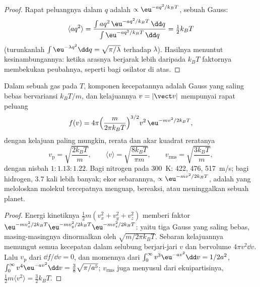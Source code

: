 \begin{proof}
Rapat peluangnya dalam $q$ adalah $\propto\eu^{-aq^2/k_BT}$, sebuah Gauss:
\[
\langle aq^2\rangle = \frac{\int aq^2\,\eu^{-aq^2/k_BT}\,\dd q}{\int\eu^{-aq^2/k_BT}\,\dd q} = \tfrac12k_BT
\]
(turunkanlah $\int\eu^{-\lambda q^2}\dd q = \sqrt{\pi/\lambda}$ terhadap
$\lambda$). Hasilnya menuntut kesinambungannya: ketika
arasnya berjarak lebih daripada $k_BT$ faktornya membekukan peubahnya,
seperti bagi osilator di atas.
\end{proof}

\begin{theorem}\label{thm:b2:boltzmann-factor:maxwell}
Dalam sebuah gas pada $T$, komponen kecepatannya adalah Gauss yang saling bebas bervariansi
$k_BT/m$, dan kelajuannya $v = |\vect v|$ mempunyai rapat
peluang
\[
f(v) = 4\pi\Big(\frac{m}{2\pi k_BT}\Big)^{3/2}v^2\,\eu^{-mv^2/2k_BT} ,
\]
dengan kelajuan paling mungkin, rerata dan akar kuadrat reratanya
\[
v_{\text{p}} = \sqrt{\frac{2k_BT}{m}}, \qquad
\langle v\rangle = \sqrt{\frac{8k_BT}{\pi m}}, \qquad
v_{\text{rms}} = \sqrt{\frac{3k_BT}{m}} ,
\]
dengan nisbah $1 : 1.13 : 1.22$. Bagi nitrogen pada \qty{300}{K}: \qty{422}{},
\qty{476}{}, \qty{517}{m/s}; bagi hidrogen, $3.7$ kali lebih banyak;
ekor sebarannya, $\propto\eu^{-mv^2/2k_BT}$, adalah yang meloloskan
molekul tercepatnya menguap, bereaksi, atau meninggalkan sebuah planet.
\end{theorem}

\begin{proof}
Energi kinetiknya $\tfrac12m(v_x^2 + v_y^2 + v_z^2)$ memberi faktor
$\eu^{-mv_x^2/2k_BT}\eu^{-mv_y^2/2k_BT}\eu^{-mv_z^2/2k_BT}$: yaitu tiga Gauss yang saling
bebas, masing-masingnya dinormalkan oleh $\sqrt{m/2\pi k_BT}$. Sebaran
kelajuannya memungut semua kecepatan dalam selubung berjari-jari $v$ dan
bervolume $4\pi v^2\dd v$. Lalu $v_{\text{p}}$ dari $\dd f/\dd v = 0$, dan
momennya dari $\int_0^\infty v^3\eu^{-av^2}\dd v = 1/2a^2$, $\int_0^\infty
v^4\eu^{-av^2}\dd v = \tfrac38\sqrt{\pi/a^5}$; $v_{\text{rms}}$ juga menyusul
dari ekuipartisinya, $\tfrac12m\langle v^2\rangle = \tfrac32k_BT$.
\end{proof}

